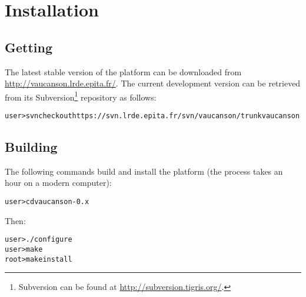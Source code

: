 \chapter{Installation}

\section{Getting \Vauc}

The latest stable version of the \Vauc platform can be downloaded
from \url{http://vaucanson.lrde.epita.fr/}.  The current development
version can be retrieved from its Subversion\footnote{%
  Subversion can be found at \url{http://subversion.tigris.org/}.
} repository as follows:

\begin{alltt}
user> svn checkout https://svn.lrde.epita.fr/svn/vaucanson/trunk vaucanson
\end{alltt}

\section{Building \Vauc}
The following commands build and install the platform (the process
takes an hour on a modern computer):
\begin{alltt}
user> cd vaucanson-0.x
\end{alltt}
Then:
\begin{alltt}
user> ./configure
user> make
root> make install
\end{alltt}
